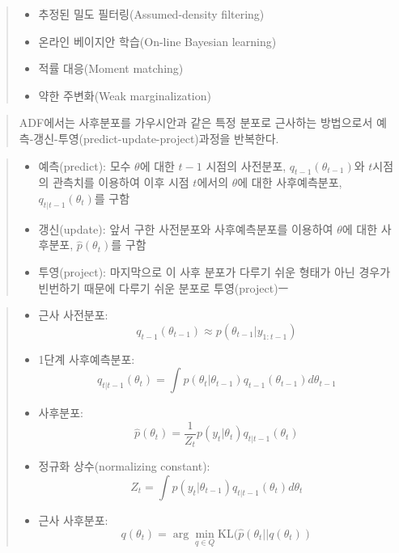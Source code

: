\documentclass[11pt]{article}
\providecommand{\tightlist}{%
      \setlength{\itemsep}{0pt}\setlength{\parskip}{0pt}}
\begin{document}
\begin{quote}
\begin{itemize}
\tightlist
\item
  추정된 밀도 필터링(Assumed-density filtering)\\
\item
  온라인 베이지안 학습(On-line Bayesian learning)\\
\item
  적률 대응(Moment matching)\\
\item
  약한 주변화(Weak marginalization)
\end{itemize}
\end{quote}

    \begin{quote}
ADF에서는 사후분포를 가우시안과 같은 특정 분포로 근사하는 방법으로서
예측-갱신-투영(predict-update-project)과정을 반복한다.
\end{quote}

\begin{quote}
\begin{itemize}
\tightlist
\item
  예측(predict): 모수 \(\theta\)에 대한 \(t-1\) 시점의 사전분포,
  \(q_{t-1}(\theta_{t-1})\)와 \(t\)시점의 관측치를 이용하여 이후 시점
  \(t\)에서의 \(\theta\)에 대한 사후예측분포,
  \(q_{t|t-1}(\theta_{t})\)를 구함
\item
  갱신(update): 앞서 구한 사전분포와 사후예측분포를 이용하여
  \(\theta\)에 대한 사후분포, \(\hat{p}(\theta_t)\)를 구함
\item
  투영(project): 마지막으로 이 사후 분포가 다루기 쉬운 형태가 아닌
  경우가 빈번하기 때문에 다루기 쉬운 분포로 투영(project)ㅡ
\end{itemize}
\end{quote}

    \begin{quote}
\begin{itemize}
\tightlist
\item
  근사 사전분포:
  \[q_{t-1}(\theta_{t-1}) \approx p(\theta_{t-1}|y_{1:t-1})\]
\item
  1단계 사후예측분포:
  \[q_{t|t-1}(\theta_t) = \int p(\theta_t | \theta_{t-1}) q_{t-1}(\theta_{t-1}) d\theta_{t-1}\]
\item
  사후분포:
  \[\hat{p}(\theta_t) = \frac{1}{Z_t}p(y_t | \theta_t)q_{t|t-1}(\theta_t)\]
\item
  정규화 상수(normalizing constant):
  \[Z_t = \int p(y_t | \theta_{t-1})q_{t|t-1}(\theta_{t})d\theta_{t}\]
\item
  근사 사후분포:
  \[q(\theta_t) = \arg\min_{q \in Q} \mathrm{KL}(\hat{p}(\theta_t || q(\theta_t)) \]
\end{itemize}
\end{quote}
\end{document}
